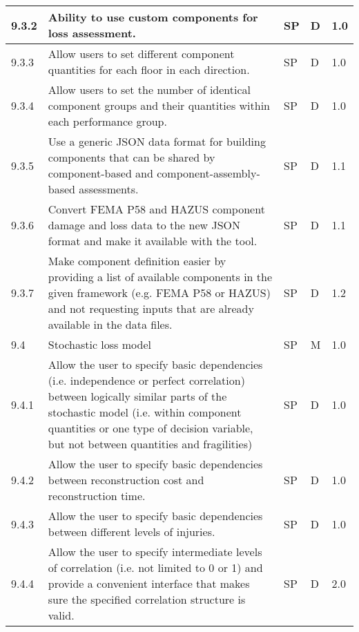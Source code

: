 \begin{longtable}{| p{} | p{} | p{} | p{} |  p{} |}
9.3.2 & Ability to use custom components for loss assessment. & SP & D & 1.0 \\ \hline
9.3.3 & Allow users to set different component quantities for each floor in each direction. & SP & D & 1.0 \\ \hline
9.3.4 & Allow users to set the number of identical component groups and their quantities within each performance group. & SP & D & 1.0 \\ \hline
9.3.5 & Use a generic JSON data format for building components that can be shared by component-based and component-assembly-based assessments. & SP & D & 1.1 \\ \hline
9.3.6 & Convert FEMA P58 and HAZUS component damage and loss data to the new JSON format and make it available with the tool. & SP & D & 1.1 \\ \hline
9.3.7 & Make component definition easier by providing a list of available components in the given framework (e.g. FEMA P58 or HAZUS) and not requesting inputs that are already available in the data files. & SP & D & 1.2 \\ \hline
9.4 & Stochastic loss model & SP & M & 1.0 \\ \hline
9.4.1 & Allow the user to specify basic dependencies (i.e. independence or perfect correlation) between logically similar parts of the stochastic model (i.e. within component quantities or one type of decision variable, but not between quantities and fragilities) & SP & D & 1.0 \\ \hline
9.4.2 & Allow the user to specify basic dependencies between reconstruction cost and reconstruction time. & SP & D & 1.0 \\ \hline
9.4.3 & Allow the user to specify basic dependencies between different levels of injuries. & SP & D & 1.0 \\ \hline
9.4.4 & Allow the user to specify intermediate levels of correlation (i.e. not limited to 0 or 1) and provide a convenient interface that makes sure the specified correlation structure is valid. & SP & D & 2.0 \\ \hline    


\end{longtable}
